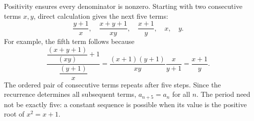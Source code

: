 Positivity ensures every denominator is nonzero. Starting with two consecutive terms $x,y$, direct calculation gives the next five terms:
\[
\dfrac{y+1}{x},\quad
\dfrac{x+y+1}{xy},\quad
\dfrac{x+1}{y},\quad x,\quad y.
\]
For example, the fifth term follows because
\[
\dfrac{\dfrac{(x+y+1)}{(xy)}+1}{\dfrac{(y+1)}{x}}
=\dfrac{(x+1)(y+1)}{xy}\dfrac{x}{y+1}
=\dfrac{x+1}{y}.
\]
The ordered pair of consecutive terms repeats after five steps. Since the recurrence determines all subsequent terms, $a_{n+5}=a_n$ for all $n$.
The period need not be exactly five: a constant sequence is possible when its value is the positive root of $x^2=x+1$.
